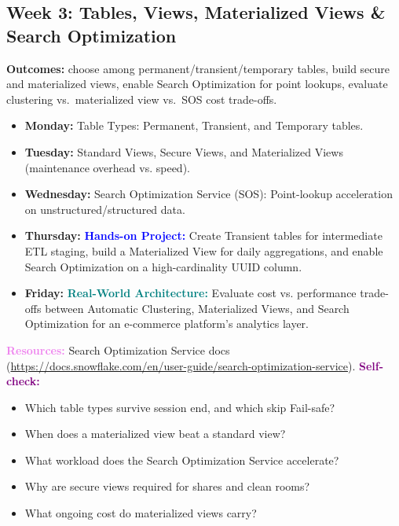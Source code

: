 \documentclass[11pt, a4paper]{article}
\newcommand{\project}[1]{\textbf{\textcolor{blue}{Hands-on Project:}} #1}
\newcommand{\usecase}[1]{\textbf{\textcolor{teal}{Real-World Architecture:}} #1}
\newcommand{\dayitem}[2]{\item \textbf{#1:} #2}
\newcommand{\resources}[1]{\vspace{1mm}\noindent\textbf{\textcolor{violet}{Resources:}} #1}
\newcommand{\selfcheck}[1]{\vspace{1mm}\noindent\textbf{\textcolor{purple}{Self-check:}} #1}
\begin{document}
\subsection*{Week 3: Tables, Views, Materialized Views \& Search Optimization}
\par\noindent\textbf{Outcomes:} choose among permanent/transient/temporary tables, build secure and materialized views, enable Search Optimization for point lookups, evaluate clustering vs.\ materialized view vs.\ SOS cost trade-offs.
\begin{itemize}[label=-]
    \dayitem{Monday}{Table Types: Permanent, Transient, and Temporary tables.}
    \dayitem{Tuesday}{Standard Views, Secure Views, and Materialized Views (maintenance overhead vs. speed).}
    \dayitem{Wednesday}{Search Optimization Service (SOS): Point-lookup acceleration on unstructured/structured data.}
    \dayitem{Thursday}{\project{Create Transient tables for intermediate ETL staging, build a Materialized View for daily aggregations, and enable Search Optimization on a high-cardinality UUID column.}}
    \dayitem{Friday}{\usecase{Evaluate cost vs. performance trade-offs between Automatic Clustering, Materialized Views, and Search Optimization for an e-commerce platform's analytics layer.}}
\end{itemize}
\resources{Search Optimization Service docs (\url{https://docs.snowflake.com/en/user-guide/search-optimization-service}).}
\selfcheck{\begin{itemize}[label=-, nosep, leftmargin=4mm]
    \item Which table types survive session end, and which skip Fail-safe?
    \item When does a materialized view beat a standard view?
    \item What workload does the Search Optimization Service accelerate?
    \item Why are secure views required for shares and clean rooms?
    \item What ongoing cost do materialized views carry?
\end{itemize}}
\end{document}

